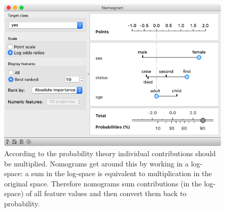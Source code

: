 \begin{figure}[h]
    \centering
    \includegraphics[scale=0.45]{graphics/ch-naive_bayes/nomogram.png}
    \caption{According to the probability theory individual contributions should be multiplied. Nomograms get around this by working in a log-space: a sum in the log-space is equivalent to multiplication in the original space. Therefore nomograms sum contributions (in the log-space) of all feature values and then convert them back to probability.}
\end{figure}
